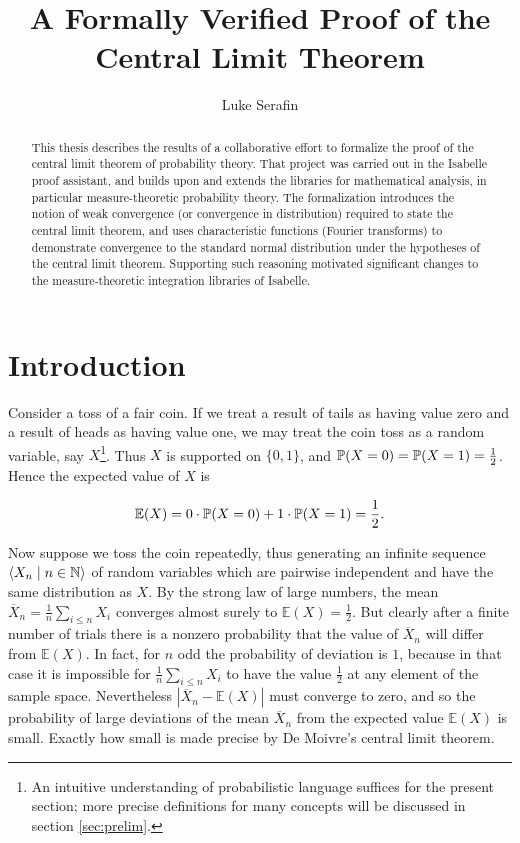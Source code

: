 \documentclass[leqno]{article}
\title{A Formally Verified Proof of the \protect\\ Central Limit Theorem}
\author{Luke Serafin}
\theoremstyle{definition}
\newcommand{\bldseq}[2]{\langle{#1}\mid{#2}\rangle}
\renewcommand{\E}{\mathbb E}
\begin{document}
\maketitle

\begin{abstract}
This thesis describes the results of a collaborative effort to formalize the proof of the central limit theorem of probability theory. That project was carried out in the Isabelle proof assistant, and builds upon and extends the libraries for mathematical analysis, in particular measure-theoretic probability theory. The formalization introduces the notion of weak convergence (or convergence in distribution) required to state the central limit theorem, and uses characteristic functions (Fourier transforms) to demonstrate convergence to the standard normal distribution under the hypotheses of the central limit theorem. Supporting such reasoning motivated significant changes to the measure-theoretic integration libraries of Isabelle.
\end{abstract}

\tableofcontents

\newpage

\section{Introduction}

Consider a toss of a fair coin. If we treat a result of tails as having value zero and a result of heads as having value one, we may treat the coin toss as a random variable, say $X$\footnote{An intuitive understanding of probabilistic language suffices for the present section; more precise definitions for many concepts will be discussed in section \ref{sec:prelim}.}. Thus $X$ is supported on $\{0,1\}$, and $\P(X = 0) = \P(X = 1) = \frac{1}{2}$. Hence the expected value of $X$ is

\[ \E(X) = 0 \cdot \P(X = 0) + 1 \cdot \P(X = 1) = \frac{1}{2}. \]

Now suppose we toss the coin repeatedly, thus generating an infinite sequence $\bldseq{X_n}{n \in \N}$ of random variables which are pairwise independent and have the same distribution as $X$. By the strong law of large numbers, the mean $\overline X_n = \frac{1}{n} \sum_{i \le n} X_i$ converges almost surely to $\E(X) = \frac{1}{2}$. But clearly after a finite number of trials there is a nonzero probability that the value of $\overline X_n$ will differ from $\E(X)$. In fact, for $n$ odd the probability of deviation is $1$, because in that case it is impossible for $\frac{1}{n} \sum_{i \le n} X_i$ to have the value $\frac{1}{2}$ at any element of the sample space. Nevertheless $|\overline X_n - \E(X)|$ must converge to zero, and so the probability of large deviations of the mean $\overline X_n$ from the expected value $\E(X)$ is small. Exactly how small is made precise by De Moivre's central limit theorem.
\end{document}
